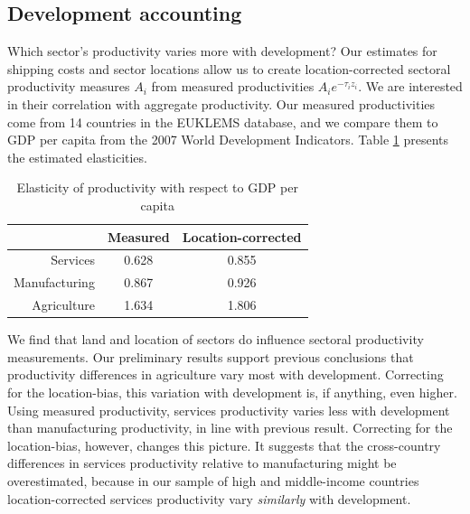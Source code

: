 \documentclass[12pt]{article}
\begin{document}
\subsection{Development accounting}

Which sector's productivity varies more with development? Our estimates for shipping costs and sector locations allow us to create location-corrected sectoral productivity measures $A_i$ from measured productivities $A_ie^{-\tau_iz_i}$. We are interested in their correlation with aggregate productivity. Our measured productivities come from 14 countries in the EUKLEMS database, and we compare them to GDP per capita from the 2007 World Development Indicators. Table \ref{tab:dev_acc} presents the estimated elasticities.

\begin{table}[h!]
  \centering
  \caption{Elasticity of productivity with respect to GDP per capita}
    \begin{tabular}{rcc}
    \toprule
    \textbf{} & \textbf{Measured} & \textbf{Location-corrected} \\
    \midrule
    Services & 0.628 & 0.855 \\
    Manufacturing & 0.867 & 0.926 \\
    Agriculture & 1.634 & 1.806 \\
    \bottomrule
    \end{tabular}%
  \label{tab:dev_acc}%
\end{table}%

We find that land and location of sectors do influence sectoral productivity measurements. Our preliminary results support previous conclusions that productivity differences in agriculture vary most with development. Correcting for the location-bias, this variation with development is, if anything, even higher. Using measured productivity, services productivity varies less with development than manufacturing productivity, in line with previous result. Correcting for the location-bias, however, changes this picture. It suggests that the cross-country differences in services productivity relative to manufacturing might be overestimated, because in our sample of high and middle-income countries location-corrected services productivity vary \emph{similarly} with development.
\end{document}
